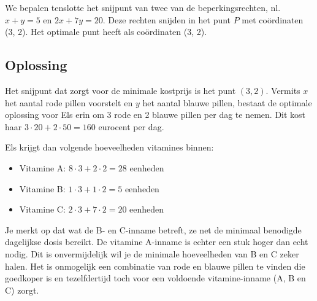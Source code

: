 We bepalen tenslotte
het snijpunt van twee van de beperkingsrechten, nl. $x + y
= 5$ en $2x + 7y = 20$. Deze rechten snijden in het punt $P$
met co\"{o}rdinaten (3, 2). Het optimale punt heeft als co\"{o}rdinaten (3, 2).


\subsection{Oplossing}
Het snijpunt dat zorgt voor de minimale kostprijs is het punt
$(3, 2)$. Vermits $x$ het aantal rode pillen voorstelt en $y$ het aantal
blauwe pillen, bestaat de optimale oplossing voor
Els erin om 3 rode en 2 blauwe pillen per dag te nemen. Dit kost
haar $3\cdot 20 + 2\cdot 50 = 160$ eurocent per dag.

Els krijgt dan volgende hoeveelheden vitamines binnen:
\begin{itemize}
    \item  Vitamine A: $8\cdot 3 + 2\cdot 2 = 28$ eenheden

    \item  Vitamine B: $1\cdot 3 + 1\cdot 2 = 5$ eenheden

    \item  Vitamine C: $2\cdot 3 + 7\cdot 2 = 20$ eenheden
\end{itemize}
Je merkt op dat wat de B- en C-inname betreft, ze net de minimaal
benodigde dagelijkse dosis bereikt. De vitamine A-inname is echter
een stuk hoger dan echt nodig. Dit is onvermijdelijk wil je de
minimale hoeveelheden van B en C zeker halen.
Het is onmogelijk een combinatie van rode en blauwe pillen te
vinden die goedkoper is en tezelfdertijd toch voor een voldoende
vitamine-inname (A, B en C) zorgt.

\newpage
